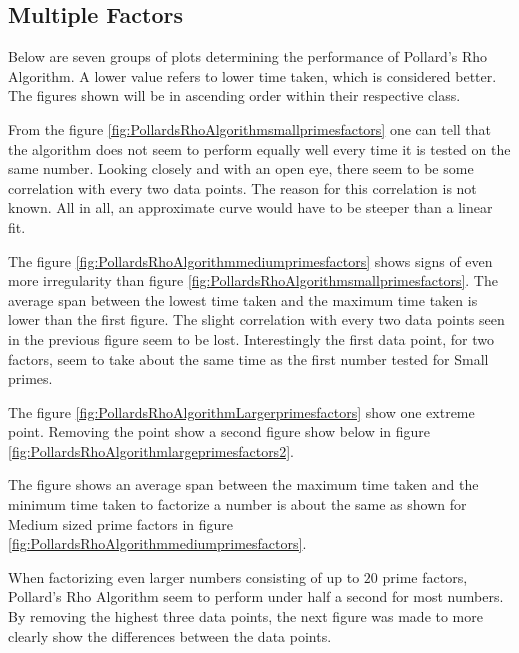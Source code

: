 \subsection{Multiple Factors}\label{PollardsMultipleFactors}

Below are seven groups of plots determining the performance of Pollard's Rho Algorithm. A lower value refers to lower time taken, which is considered better. The figures shown will be in ascending order within their respective class.



From the figure \ref{fig:PollardsRhoAlgorithmsmallprimesfactors} one can tell that the algorithm does not seem to perform equally well every time it is tested on the same number. Looking closely and with an open eye, there seem to be some correlation with every two data points. The reason for this correlation is not known. All in all, an approximate curve would have to be steeper than a linear fit. 



The figure \ref{fig:PollardsRhoAlgorithmmediumprimesfactors} shows signs of even more irregularity than figure \ref{fig:PollardsRhoAlgorithmsmallprimesfactors}. The average span between the lowest time taken and the maximum time taken is lower than the first figure. The slight correlation with every two data points seen in the previous figure seem to be lost. Interestingly the first data point, for two factors, seem to take about the same time as the first number tested for Small primes.



The figure \ref{fig:PollardsRhoAlgorithmLargerprimesfactors} show one extreme point. Removing the point show a second figure show below in figure \ref{fig:PollardsRhoAlgorithmlargeprimesfactors2}.



The figure shows an average span between the maximum time taken and the minimum time taken to factorize a number is about the same as shown for Medium sized prime factors in figure \ref{fig:PollardsRhoAlgorithmmediumprimesfactors}.



When factorizing even larger numbers consisting of up to $20$ prime factors, Pollard's Rho Algorithm seem to perform under half a second for most numbers. By removing the highest three data points, the next figure was made to more clearly show the differences between the data points.

